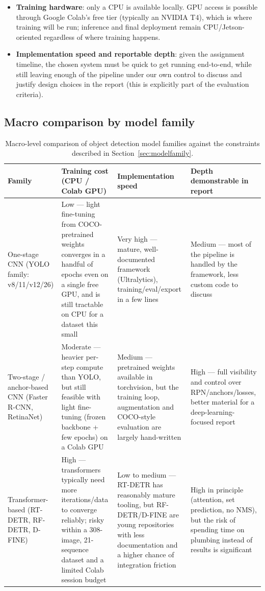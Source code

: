 \documentclass[11pt,a4paper]{article}
\begin{document}
\begin{itemize}[nosep]
    \item \textbf{Training hardware}: only a CPU is available locally. GPU access is possible
          through Google Colab's free tier (typically an NVIDIA T4), which is where training will
          be run; inference and final deployment remain CPU/Jetson-oriented regardless of where
          training happens.
    \item \textbf{Implementation speed and reportable depth}: given the assignment timeline, the
          chosen system must be quick to get running end-to-end, while still leaving enough of
          the pipeline under our own control to discuss and justify design choices in the report
          (this is explicitly part of the evaluation criteria).
\end{itemize}

\subsection{Macro comparison by model family}

\begin{table}[H]
\centering
\small
\begin{tabular}{p{2.6cm}p{3.2cm}p{3.2cm}p{3.4cm}}
\toprule
\textbf{Family} & \textbf{Training cost (CPU / Colab GPU)} & \textbf{Implementation speed} & \textbf{Depth demonstrable in report} \\
\midrule
One-stage CNN (YOLO family: v8/11/v12/26) &
Low --- light fine-tuning from COCO-pretrained weights converges in a handful of epochs even on
a single free GPU, and is still tractable on CPU for a dataset this small &
Very high --- mature, well-documented framework (Ultralytics), training/eval/export in a few
lines &
Medium --- most of the pipeline is handled by the framework, less custom code to discuss \\
\addlinespace
Two-stage / anchor-based CNN (Faster R-CNN, RetinaNet) &
Moderate --- heavier per-step compute than YOLO, but still feasible with light fine-tuning
(frozen backbone + few epochs) on a Colab GPU &
Medium --- pretrained weights available in torchvision, but the training loop, augmentation and
COCO-style evaluation are largely hand-written &
High --- full visibility and control over RPN/anchors/losses, better material for a
deep-learning-focused report \\
\addlinespace
Transformer-based (RT-DETR, RF-DETR, D-FINE) &
High --- transformers typically need more iterations/data to converge reliably; risky within a
308-image, 21-sequence dataset and a limited Colab session budget &
Low to medium --- RT-DETR has reasonably mature tooling, but RF-DETR/D-FINE are young
repositories with less documentation and a higher chance of integration friction &
High in principle (attention, set prediction, no NMS), but the risk of spending time on plumbing
instead of results is significant \\
\bottomrule
\end{tabular}
\caption{Macro-level comparison of object detection model families against the constraints
described in Section~\ref{sec:modelfamily}.}
\label{tab:modelfamily}
\end{table}
\end{document}
